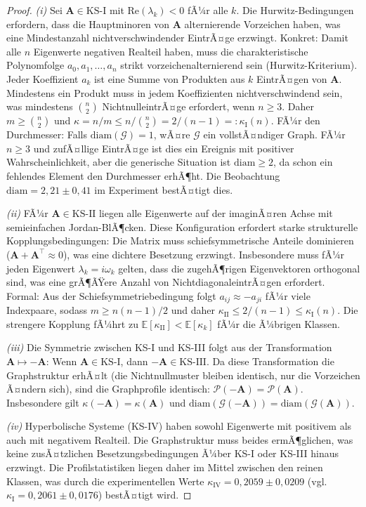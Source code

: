 ﻿\documentclass[12pt, a4paper, titlepage]{report}
\theoremstyle{definition}
\theoremstyle{remark}
\newcommand{\vA}{\bm{A}}
\newcommand{\T}{\top}
\newcommand{\re}{\mathrm{Re}}
\newcommand{\KS}{\mathrm{KS}}
\begin{document}
\begin{proof}
\textit{(i)} Sei $\vA \in \KS\text{-I}$ mit $\re(\lambda_k) < 0$ fÃ¼r alle $k$.
Die Hurwitz-Bedingungen erfordern, dass die Hauptminoren von $\vA$ alternierende
Vorzeichen haben, was eine Mindestanzahl nichtverschwindender EintrÃ¤ge erzwingt.
Konkret: Damit alle $n$ Eigenwerte negativen Realteil haben, muss die charakteristische
Polynomfolge $a_0, a_1, \ldots, a_n$ strikt vorzeichenalternierend sein (Hurwitz-Kriterium).
Jeder Koeffizient $a_k$ ist eine Summe von Produkten aus $k$ EintrÃ¤gen von $\vA$.
Mindestens ein Produkt muss in jedem Koeffizienten nichtverschwindend sein, was
mindestens $\binom{n}{2}$ NichtnulleintrÃ¤ge erfordert, wenn $n \geq 3$.
Daher $m \geq \binom{n}{2}$ und $\kappa = n/m \leq n/\binom{n}{2} = 2/(n-1) =:
\kappa_{\mathrm{I}}(n)$.
FÃ¼r den Durchmesser: Falls $\mathrm{diam}(\mathcal{G}) = 1$, wÃ¤re $\mathcal{G}$
ein vollstÃ¤ndiger Graph. FÃ¼r $n \geq 3$ und zufÃ¤llige EintrÃ¤ge ist dies ein
Ereignis mit positiver Wahrscheinlichkeit, aber die generische Situation ist
$\mathrm{diam} \geq 2$, da schon ein fehlendes Element den Durchmesser erhÃ¶ht.
Die Beobachtung $\mathrm{diam} = 2{,}21 \pm 0{,}41$ im Experiment bestÃ¤tigt dies.

\textit{(ii)} FÃ¼r $\vA \in \KS\text{-II}$ liegen alle Eigenwerte auf der imaginÃ¤ren
Achse mit semieinfachen Jordan-BlÃ¶cken. Diese Konfiguration erfordert starke strukturelle
Kopplungsbedingungen: Die Matrix muss schiefsymmetrische Anteile dominieren
($\vA + \vA^\T \approx 0$), was eine dichtere Besetzung erzwingt. Insbesondere
muss fÃ¼r jeden Eigenwert $\lambda_k = i\omega_k$ gelten, dass die zugehÃ¶rigen
Eigenvektoren orthogonal sind, was eine grÃ¶ÃŸere Anzahl von NichtdiagonaleintrÃ¤gen
erfordert. Formal: Aus der Schiefsymmetriebedingung folgt $a_{ij} \approx -a_{ji}$
fÃ¼r viele Indexpaare, sodass $m \geq n(n-1)/2$ und daher
$\kappa_{\mathrm{II}} \leq 2/(n-1) \leq \kappa_{\mathrm{I}}(n)$.
Die strengere Kopplung fÃ¼hrt zu $\mathbb{E}[\kappa_{\mathrm{II}}] < \mathbb{E}[\kappa_k]$
fÃ¼r die Ã¼brigen Klassen.

\textit{(iii)} Die Symmetrie zwischen KS-I und KS-III folgt aus der Transformation
$\vA \mapsto -\vA$: Wenn $\vA \in \KS\text{-I}$, dann $-\vA \in \KS\text{-III}$.
Da diese Transformation die Graphstruktur erhÃ¤lt (die Nichtnullmuster bleiben identisch,
nur die Vorzeichen Ã¤ndern sich), sind die Graphprofile identisch:
$\mathcal{P}(-\vA) = \mathcal{P}(\vA)$. Insbesondere gilt
$\kappa(-\vA) = \kappa(\vA)$ und $\mathrm{diam}(\mathcal{G}(-\vA)) =
\mathrm{diam}(\mathcal{G}(\vA))$.

\textit{(iv)} Hyperbolische Systeme (KS-IV) haben sowohl Eigenwerte mit positivem als
auch mit negativem Realteil. Die Graphstruktur muss beides ermÃ¶glichen, was keine
zusÃ¤tzlichen Besetzungsbedingungen Ã¼ber KS-I oder KS-III hinaus erzwingt. Die
Profilstatistiken liegen daher im Mittel zwischen den reinen Klassen, was durch
die experimentellen Werte $\kappa_{\mathrm{IV}} = 0{,}2059 \pm 0{,}0209$
(vgl.\ $\kappa_{\mathrm{I}} = 0{,}2061 \pm 0{,}0176$) bestÃ¤tigt wird.
\end{proof}
\end{document}
